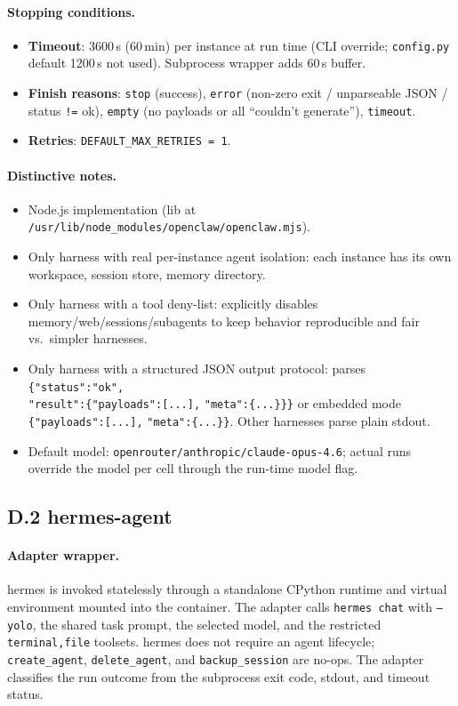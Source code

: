 \documentclass{llmxive}
\begin{document}
\paragraph{Stopping conditions.}
\begin{itemize}
  \item \textbf{Timeout}: 3600\,s (60\,min) per instance at run time (CLI override; \texttt{config.py} default 1200\,s not used). Subprocess wrapper adds 60\,s buffer.
  \item \textbf{Finish reasons}: \texttt{stop} (success), \texttt{error} (non-zero exit / unparseable JSON / status \texttt{!=} ok), \texttt{empty} (no payloads or all ``couldn't generate''), \texttt{timeout}.
  \item \textbf{Retries}: \texttt{DEFAULT\_MAX\_RETRIES = 1}.
\end{itemize}

\paragraph{Distinctive notes.}
\begin{itemize}
  \item Node.js implementation (lib at \texttt{/usr/lib/}\allowbreak\texttt{node\_modules/openclaw/openclaw.mjs}).
  \item Only harness with real per-instance agent isolation: each instance has its own workspace, session store, memory directory.
  \item Only harness with a tool deny-list: explicitly disables memory/web/sessions/subagents to keep behavior reproducible and fair vs.\ simpler harnesses.
  \item Only harness with a structured JSON output protocol: parses \texttt{\{"status":"ok",} \\\texttt{"result":\{"payloads":[...],} \texttt{"meta":\{...\}\}\}} or embedded mode \texttt{\{"payloads":[...],} \texttt{"meta":\{...\}\}}. Other harnesses parse plain stdout.
  \item Default model: \texttt{openrouter/anthropic/claude-opus-4.6}; actual runs override the model per cell through the run-time model flag.
\end{itemize}

\subsection*{D.2 hermes-agent}

\paragraph{Adapter wrapper.}
hermes is invoked statelessly through a standalone CPython runtime and virtual environment mounted into the container. The adapter calls \texttt{hermes chat} with \texttt{--yolo}, the shared task prompt, the selected model, and the restricted \texttt{terminal,file} toolsets. hermes does not require an agent lifecycle; \texttt{create\_agent}, \texttt{delete\_agent}, and \texttt{backup\_session} are no-ops. The adapter classifies the run outcome from the subprocess exit code, stdout, and timeout status.
\end{document}
